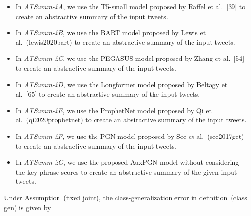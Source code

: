 \documentclass{article}
\begin{document}

\begin{itemize}
    \item In \textit{ATSumm-2A}, we use the T5-small model proposed by Raffel et al.~[39] to create an abstractive summary of the input tweets.
    \item In \textit{ATSumm-2B}, we use the BART model proposed by Lewis et al.~(lewis2020bart) to create an abstractive summary of the input tweets.
    \item In \textit{ATSumm-2C}, we use the PEGASUS model proposed by Zhang et al.~[54] to create an abstractive summary of the input tweets.
    \item In \textit{ATSumm-2D}, we use the Longformer model proposed by Beltagy et al.~[65] to create an abstractive summary of the input tweets.
    \item In \textit{ATSumm-2E}, we use the ProphetNet model proposed by Qi et al.~(qi2020prophetnet) to create an abstractive summary of the input tweets.
    \item In \textit{ATSumm-2F}, we use the PGN model proposed by See et al.~(see2017get) to create an abstractive summary of the input tweets.
    \item In \textit{ATSumm-2G}, we use the proposed AuxPGN model without considering the key-phrase scores to create an abstractive summary of the given input tweets.
\end{itemize}

\begin{lemma}
  Under Assumption~(fixed joint), the class-generalization error  in definition~(class gen) is given by
\end{lemma}
\end{document}
